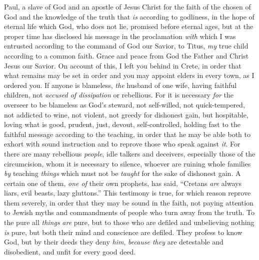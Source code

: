 
\begin{biblechapter} %
 Paul, a slave of God and an apostle of Jesus Christ for the faith of the chosen of God and the knowledge of the truth that \textit{is} according to godliness,
\verse in the hope of eternal life which God, who does not lie, promised before eternal ages,
\verse but at the proper time has disclosed his message in the proclamation \textit{with} which I was entrusted according to the command of God our Savior,
\verse to Titus, \textit{my} true child according to a common faith. Grace and peace from God the Father and Christ Jesus our Savior.
 On account of this, I left you behind in Crete, in order that what remains may be set in order and you may appoint elders in every town, as I ordered you.
\verse If anyone is blameless, \textit{the} husband of one wife, having faithful children, not \textit{accused of dissipation} or rebellious.
\verse For it is necessary \textit{for} the overseer to be blameless as God’s steward, not self-willed, not quick-tempered, not addicted to wine, not violent, not greedy for dishonest gain,
\verse but hospitable, loving what is good, prudent, just, devout, self-controlled,
\verse holding fast to the faithful message according to the teaching, in order that he may be able both to exhort with sound instruction and to reprove those who speak against \textit{it}.
\verse For there are many rebellious \textit{people}, idle talkers and deceivers, especially those of the circumcision,
\verse whom it is necessary to silence, whoever are ruining whole families \textit{by} teaching \textit{things} which must not be \textit{taught} for the sake of dishonest gain.
\verse A certain one of them, \textit{one of} their own prophets, has said, “Cretans \textit{are} always liars, evil beasts, lazy gluttons.”
\verse This testimony is true, for which reason reprove them severely, in order that they may be sound in the faith,
\verse not paying attention to Jewish myths and commandments of people who turn away from the truth.
\verse To the pure all \textit{things} \textit{are} pure, but to those who are defiled and unbelieving nothing \textit{is} pure, but both their mind and conscience are defiled.
\verse They profess to know God, but by their deeds they deny \textit{him}, \textit{because they} are detestable and disobedient, and unfit for every good deed.
\end{biblechapter}

